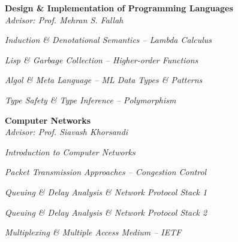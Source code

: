 \documentclass[margin, 10pt]{res} %
\begin{document}
\begin{resume}
        \textbf{Design \& Implementation of Programming Languages}\\
    	\textit{Advisor: Prof. Mehran S. Fallah}
	    \begin{innerlist}
	    	\item \textit{Induction \& Denotational Semantics -- Lambda Calculus} \href{https://github.com/aligholamee/HALFLIFE/raw/master/reports/PL29531504.pdf}{\hfill\UrlFont[docs]}
	    	\item \textit{Lisp \& Garbage Collection -- Higher-order Functions} \href{https://github.com/aligholamee/HALFLIFE/raw/master/reports/PL39531504.pdf}{\hfill\UrlFont[docs]}
	    	\item \textit{Algol \& Meta Language -- ML Data Types \& Patterns} \href{https://github.com/aligholamee/HALFLIFE/raw/master/reports/PL49531504.pdf}{\hfill\UrlFont[docs]}
	    	\item \textit{Type Safety \& Type Inference -- Polymorphism} \href{https://github.com/aligholamee/HALFLIFE/raw/master/reports/PL49531504.pdf}{\hfill\UrlFont[docs]}
	    \end{innerlist}

        \textbf{Computer Networks}\\
		\textit{Advisor: Prof. Siavash Khorsandi}
		\begin{innerlist}
			\item \textit{Introduction to Computer Networks} \href{https://github.com/aligholamee/Compnets/raw/master/docs/assignment-1/compnet_assignment_1_9531504.pdf}{\hfill\UrlFont[docs]}
		
			\item \textit{Packet Transmission Approaches -- Congestion Control} \href{https://github.com/aligholamee/Compnets/raw/master/docs/assignment-2/compnet_assignment_2_9531504.pdf}{\hfill\UrlFont[docs]}

			\item \textit{Queuing \& Delay Analysis \& Network Protocol Stack 1} \href{https://github.com/aligholamee/Compnets/raw/master/docs/assignment-3/compnet_assignment_3_9531504.pdf}{\hfill\UrlFont[docs]}
			
			\item \textit{Queuing \& Delay Analysis \& Network Protocol Stack 2} \href{https://github.com/aligholamee/Compnets/raw/master/docs/assignment-4/compnet_assignment_4_9531504.pdf}{\hfill\UrlFont[docs]}
			
			\item \textit{Multiplexing \& Multiple Access Medium -- IETF} \href{https://github.com/aligholamee/Compnets/raw/master/docs/assignment-5/compnet_assignment_5_9531504.pdf}{\hfill\UrlFont[docs]}
			

\end{innerlist}
\end{resume}
\end{document}
